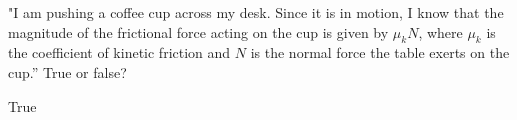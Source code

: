 "I am pushing a coffee cup across my desk. Since it is in motion, I know that the magnitude of the frictional force acting on the cup is given by $\mu_kN$, where $\mu_k$ is the coefficient of kinetic friction and $N$ is the normal force the table exerts on the cup.” True or false?

\begin{solution}
    True
\end{solution}